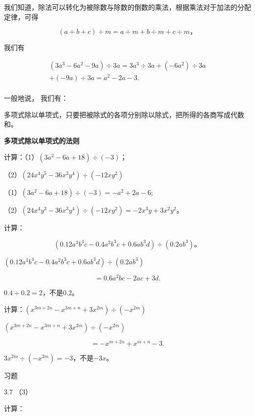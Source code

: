 我们知道，除法可以转化为被除数与除数的倒数的乘法，根据乘法对于加法的分配定律，可得

\[
(a + b + c) \div m = a \div m + b \div m + c \div m\text{，}
\]

我们有

\[
\begin{array}{l} (3 a ^{3} - 6 a ^{2} - 9 a) \div 3 a = 3 a ^{3} \div 3 a + (- 6 a ^{2}) \div 3 a \\ + (- 9 a) \div 3 a = a ^{2} - 2 a - 3. \\ \end{array}
\]

一般地说， 我们有：

多项式除以单项式，只要把被除式的各项分别除以除式，把所得的各商写成代数和。

\textbf{多项式除以单项式的法则}

 计算：（1）\((3a^{2} - 6a + 18) \div (-3)\)；

（2）\((24x^{4}y^{5} - 36x^{2}y^{4})\div (-12xy^{2})\)

 （1）\((3a^{2} - 6a + 18) \div (-3) = -a^{2} + 2a - 6;\)

（2）\((24x^{4}y^{3} - 36x^{3}y^{4})\div (-12xy^{2}) = -2x^{3}y + 3x^{2}y^{2}\)。

 计算：

\[
(0.12 a ^{3} b ^{4} c - 0.4 a ^{2} b ^{3} c + 0.6 a b ^{3} d) \div (0.2 a b ^{3})\text{。}
\]

\((0.12a^{3}b^{4}c - 0.4a^{2}b^{3}c + 0.6ab^{3}d)\div (0.2ab^{3})\)

\[
= 0.6 a ^{2} b c - 2 a c + 3 d.
\]

\(0.4 \div 0.2 = 2\)，不是\(0.2\)。

 计算：\((x^{3m+2n}-x^{3m+n}+3x^{2m})\div(-x^{2m})\)

\((x^{3m + 2n} - x^{3m + n} + 3x^{2m})\div (-x^{2m})\)

\[
= - x ^{m + 2 n} + x ^{m + n} - 3.
\]

\(3x^{2m} \div (-x^{2m}) = -3\)，不是\(-3x\)。

习题

3.7 （3）

计算：

